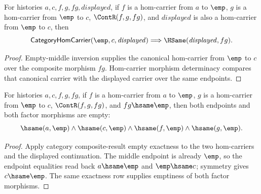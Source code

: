 \begin{theorem}
\label{thm:category-hom-carrier-comp-empty-middle-displayed-morphism-deterministic}
For histories $a,c,f,g,fg,\mathit{displayed}$, if $f$ is a hom-carrier from $a$ to
$\emp$, $g$ is a hom-carrier from $\emp$ to $c$, $\ContR(f,g,fg)$, and
$\mathit{displayed}$ is also a hom-carrier from $\emp$ to $c$, then
$$
\mathsf{CategoryHomCarrier}(\emp,c,\mathit{displayed})\Longrightarrow
\HSame(\mathit{displayed},fg).
$$
\end{theorem}
\begin{proof}
Empty-middle inversion supplies the canonical hom-carrier from $\emp$ to $c$
over the composite morphism $fg$. Hom-carrier morphism determinacy compares
that canonical carrier with the displayed carrier over the same endpoints.
\end{proof}

\begin{theorem}
\label{thm:category-hom-carrier-comp-empty-middle-empty-result-components}
For histories $a,c,f,g,fg$, if $f$ is a hom-carrier from $a$ to $\emp$,
$g$ is a hom-carrier from $\emp$ to $c$, $\ContR(f,g,fg)$, and
$fg\hsame\emp$, then both endpoints and both factor morphisms are empty:
$$
\hsame(a,\emp)\wedge\hsame(c,\emp)\wedge
\hsame(f,\emp)\wedge\hsame(g,\emp).
$$
\end{theorem}
\begin{proof}
Apply category composite-result empty exactness to the two hom-carriers and
the displayed continuation. The middle endpoint is already $\emp$, so the
endpoint equalities read back $a\hsame\emp$ and $\emp\hsame c$; symmetry gives
$c\hsame\emp$. The same exactness row supplies emptiness of both factor
morphisms.
\end{proof}

